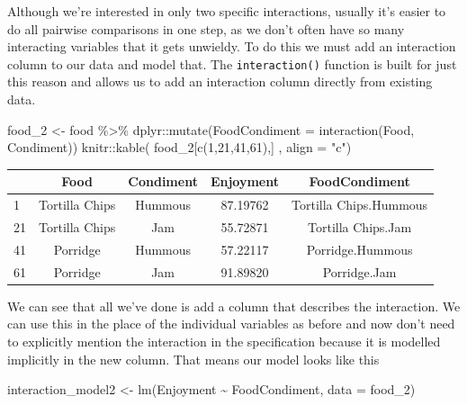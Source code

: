 \documentclass[
]{book}
\newenvironment{Shaded}{\begin{snugshade}}{\end{snugshade}}
\newcommand{\AttributeTok}[1]{\textcolor[rgb]{0.77,0.63,0.00}{#1}}
\newcommand{\DecValTok}[1]{\textcolor[rgb]{0.00,0.00,0.81}{#1}}
\newcommand{\FunctionTok}[1]{\textcolor[rgb]{0.00,0.00,0.00}{#1}}
\newcommand{\NormalTok}[1]{#1}
\newcommand{\OtherTok}[1]{\textcolor[rgb]{0.56,0.35,0.01}{#1}}
\newcommand{\SpecialCharTok}[1]{\textcolor[rgb]{0.00,0.00,0.00}{#1}}
\newcommand{\StringTok}[1]{\textcolor[rgb]{0.31,0.60,0.02}{#1}}
\begin{document}
Although we're interested in only two specific interactions, usually it's easier to do all pairwise comparisons in one step, as we don't often have so many interacting variables that it gets unwieldy. To do this we must add an interaction column to our data and model that. The \texttt{interaction()} function is built for just this reason and allows us to add an interaction column directly from existing data.

\begin{Shaded}
\begin{Highlighting}[]
\NormalTok{food\_2 }\OtherTok{\textless{}{-}}\NormalTok{ food }\SpecialCharTok{\%\textgreater{}\%}\NormalTok{ dplyr}\SpecialCharTok{::}\FunctionTok{mutate}\NormalTok{(}\AttributeTok{FoodCondiment =} \FunctionTok{interaction}\NormalTok{(Food, Condiment))}
\NormalTok{knitr}\SpecialCharTok{::}\FunctionTok{kable}\NormalTok{( food\_2[}\FunctionTok{c}\NormalTok{(}\DecValTok{1}\NormalTok{,}\DecValTok{21}\NormalTok{,}\DecValTok{41}\NormalTok{,}\DecValTok{61}\NormalTok{),] , }\AttributeTok{align =} \StringTok{"c"}\NormalTok{)}
\end{Highlighting}
\end{Shaded}

\begin{tabular}{l|c|c|c|c}
\hline
  & Food & Condiment & Enjoyment & FoodCondiment\\
\hline
1 & Tortilla Chips & Hummous & 87.19762 & Tortilla Chips.Hummous\\
\hline
21 & Tortilla Chips & Jam & 55.72871 & Tortilla Chips.Jam\\
\hline
41 & Porridge & Hummous & 57.22117 & Porridge.Hummous\\
\hline
61 & Porridge & Jam & 91.89820 & Porridge.Jam\\
\hline
\end{tabular}

We can see that all we've done is add a column that describes the interaction. We can use this in the place of the individual variables as before and now don't need to explicitly mention the interaction in the specification because it is modelled implicitly in the new column. That means our model looks like this

\begin{Shaded}
\begin{Highlighting}[]
\NormalTok{interaction\_model2 }\OtherTok{\textless{}{-}} \FunctionTok{lm}\NormalTok{(Enjoyment }\SpecialCharTok{\textasciitilde{}}\NormalTok{ FoodCondiment, }\AttributeTok{data =}\NormalTok{ food\_2)}
\end{Highlighting}
\end{Shaded}
\end{document}
